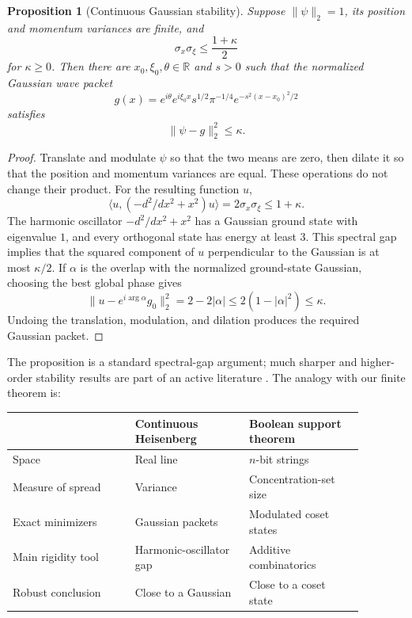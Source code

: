 \documentclass[11pt]{article}
\newtheorem{proposition}[theorem]{Proposition}
\theoremstyle{remark}
\newcommand{\1}{\mathbf 1}
\begin{document}
\begin{proposition}[Continuous Gaussian stability]\label{prop:continuous}
Suppose $\|\psi\|_2=1$, its position and momentum variances are finite, and
\[
  \sigma_x\sigma_\xi\leq\frac{1+\kappa}{2}
\]
for $\kappa\geq0$. Then there are
$x_0,\xi_0,\theta\in\mathbb R$ and $s>0$ such that the normalized Gaussian
wave packet
\[
  g(x)=e^{i\theta}e^{i\xi_0x}s^{1/2}\pi^{-1/4}
       e^{-s^2(x-x_0)^2/2}
\]
satisfies
\[
  \|\psi-g\|_2^2\leq\kappa.
\]
\end{proposition}

\begin{proof}
Translate and modulate $\psi$ so that the two means are zero, then dilate it
so that the position and momentum variances are equal. These operations do
not change their product. For the resulting function $u$,
\[
  \langle u,(-d^2/dx^2+x^2)u\rangle
  =2\sigma_x\sigma_\xi\leq1+\kappa.
\]
The harmonic oscillator $-d^2/dx^2+x^2$ has a Gaussian ground state with
eigenvalue $1$, and every orthogonal state has energy at least $3$. This
spectral gap implies that the squared component of $u$ perpendicular to the
Gaussian is at most $\kappa/2$. If $\alpha$ is the overlap with the
normalized ground-state Gaussian, choosing the best global phase gives
\[
  \|u-e^{i\arg\alpha}g_0\|_2^2
  =2-2|\alpha|
  \leq2(1-|\alpha|^2)
  \leq\kappa.
\]
Undoing the translation, modulation, and dilation produces the required
Gaussian packet.
\end{proof}

The proposition is a standard spectral-gap argument; much sharper and
higher-order stability results are part of an active literature
\cite{DoLamLu2026}. The analogy with our finite theorem is:
\begin{center}
\begin{tabular}{p{0.30\linewidth}p{0.29\linewidth}p{0.29\linewidth}}
\hline
 & Continuous Heisenberg & Boolean support theorem\\
\hline
Space & Real line & $n$-bit strings\\
Measure of spread & Variance & Concentration-set size\\
Exact minimizers & Gaussian packets & Modulated coset states\\
Main rigidity tool & Harmonic-oscillator gap & Additive combinatorics\\
Robust conclusion & Close to a Gaussian & Close to a coset state\\
\hline
\end{tabular}
\end{center}
\end{document}
